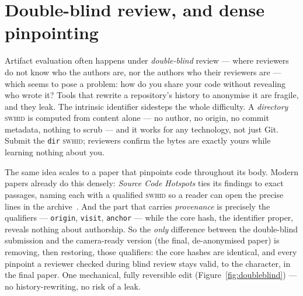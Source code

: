 \section{Double-blind review, and dense pinpointing}

Artifact evaluation often happens under \emph{double-blind} review --- where reviewers do not know
who the authors are, nor the authors who their reviewers are --- which seems to pose a problem: how
do you share your code without revealing who wrote it? Tools that rewrite a repository's history
to anonymise it are fragile, and they leak. The intrinsic identifier sidesteps the whole difficulty.
A \emph{directory} \textsc{swhid} is computed from content alone --- no author, no origin, no commit
metadata, nothing to scrub --- and it works for any technology, not just Git. Submit the
\texttt{dir} \textsc{swhid}; reviewers confirm the bytes are exactly yours while learning nothing
about you.

The same idea scales to a paper that pinpoints code throughout its body. Modern papers already do
this densely: \emph{Source Code Hotspots} ties its findings to exact passages, naming each with a
qualified \textsc{swhid} so a reader can open the precise lines in the
archive~\autocite{spinellis2026hotspots}. And the part that carries \emph{provenance} is precisely
the qualifiers --- \texttt{origin}, \texttt{visit}, \texttt{anchor} --- while the core hash, the
identifier proper, reveals nothing about authorship. So the \emph{only} difference between the
double-blind submission and the camera-ready version (the final, de-anonymised paper) is removing,
then restoring, those qualifiers: the core
hashes are identical, and every pinpoint a reviewer checked during blind review stays valid, to the
character, in the final paper. One mechanical, fully reversible edit (Figure~\ref{fig:doubleblind})
--- no history-rewriting, no risk of a leak.

